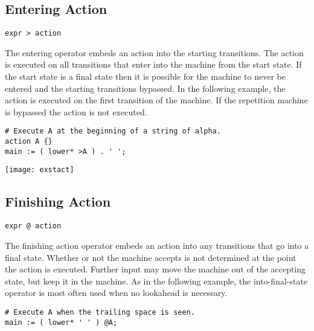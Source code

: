 \documentclass[letterpaper,11pt,oneside]{book}
\newcommand{\verbspace}{\vspace{10pt}}
\newcommand{\graphspace}{\vspace{10pt}}
\newenvironment{inline_code}{\def\baselinestretch{1}\vspace{12pt}\small}{}
\begin{document}
\subsection{Entering Action}

\verb|expr > action| 
\verbspace

The entering operator embeds an action into the starting transitions. The
action is executed on all transitions that enter into the machine from the
start state.  If the start state is a final state then it is possible for the
machine to never be entered and the starting transitions bypassed.  In the
following example, the action is executed on the first transition of the
machine. If the repetition machine is bypassed the action is not executed.

\verbspace

% GENERATE: exstact
\begin{inline_code}
\begin{verbatim}
# Execute A at the beginning of a string of alpha.
action A {}
main := ( lower* >A ) . ' ';
\end{verbatim}
\end{inline_code}

\graphspace
\begin{center}
\texttt{[image: exstact]}
\end{center}
\graphspace

\subsection{Finishing Action}

\verb|expr @ action|
\verbspace

The finishing action operator embeds an action into any transitions that go into a
final state. Whether or not the machine accepts is not determined at the point
the action is executed. Further input may move the machine out of the accepting
state, but keep it in the machine. As in the following example, the
into-final-state operator is most often used when no lookahead is necessary.

\begin{inline_code}
\begin{verbatim}
# Execute A when the trailing space is seen.
main := ( lower* ' ' ) @A;
\end{verbatim}
\end{inline_code}
\end{document}
